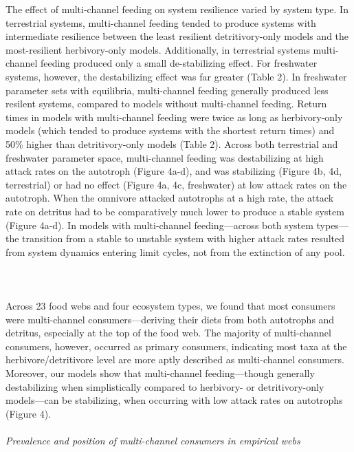\documentclass[12pt,a4paper,oneside]{article}
\begin{document}
\newline
\indent The effect of multi-channel feeding on system resilience varied by system type. In terrestrial systems, multi-channel feeding tended to produce systems with
intermediate resilience between the least resilient detritivory-only
models and the most-resilient herbivory-only models. Additionally, in terrestrial
systems multi-channel feeding produced only a small
de-stabilizing effect. For freshwater systems, however, the
destabilizing effect was far greater (Table 2). In freshwater parameter sets with equilibria, 
multi-channel feeding generally produced less resilent systems, compared to models without multi-channel feeding. Return times in models with multi-channel feeding were twice as long as herbivory-only models (which tended to produce systems with the shortest return times) and 50\% higher than detritivory-only models (Table 2). 
\newline
\indent Across both terrestrial and freshwater parameter space, multi-channel feeding was
destabilizing at high attack rates on the autotroph (Figure 4a-d), and was
stabilizing (Figure 4b, 4d, terrestrial) or had no effect (Figure 4a, 4c,
freshwater) at low attack rates on the autotroph. When the omnivore
attacked autotrophs at a high rate, the attack rate on
detritus had to be comparatively much lower to produce a stable system
(Figure 4a-d). In models with multi-channel feeding---across both system types---the transition from a stable to unstable system with higher attack rates resulted from system dynamics entering limit cycles, not from the extinction of any pool. 
\\
\\
\\
\\
\indent Across 23 food webs and four ecosystem types, we found that most
consumers were multi-channel consumers---deriving their diets from both
autotrophs and detritus, especially at the top of the food
web. The majority of multi-channel consumers, however, occurred as primary
consumers, indicating most taxa at the herbivore/detritivore level
are more aptly described as multi-channel consumers. Moreover, our models show that
multi-channel feeding---though generally destabilizing when simplistically compared to herbivory- or detritivory-only models---can be stabilizing, when occurring with low attack
rates on autotrophs (Figure 4). 
\\
\\
\noindent \emph{Prevalence and position of multi-channel consumers in empirical webs}\\
\end{document}
